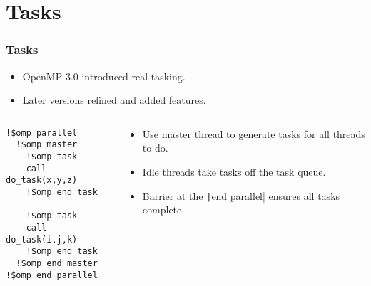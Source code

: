 \documentclass{beamer}
\begin{document}
\section{Tasks}
\begin{frame}[fragile]
\frametitle{Tasks}
\begin{itemize}
  \item OpenMP 3.0 introduced real tasking.
  \item Later versions refined and added features.
\end{itemize}

\begin{columns}
\begin{column}{0.5\textwidth}
\begin{verbatim}
!$omp parallel
  !$omp master
    !$omp task
    call do_task(x,y,z)
    !$omp end task

    !$omp task
    call do_task(i,j,k)
    !$omp end task
  !$omp end master
!$omp end parallel
\end{verbatim}
\end{column}

\begin{column}{0.5\textwidth}
\begin{itemize}
  \item Use master thread to generate tasks for all threads to do.
  \item Idle threads take tasks off the task queue.
  \item Barrier at the \texttt|end parallel| ensures all tasks complete.
\end{itemize}
\end{column}
\end{columns}

\end{frame}
\end{document}
